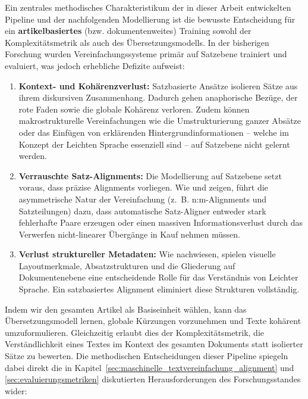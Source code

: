 Ein zentrales methodisches Charakteristikum der in dieser Arbeit entwickelten Pipeline und der nachfolgenden Modellierung ist die bewusste Entscheidung für ein \textbf{artikelbasiertes} (bzw. dokumentenweites) Training sowohl der Komplexitätsmetrik als auch des Übersetzungsmodells. In der bisherigen Forschung wurden Vereinfachungssysteme primär auf Satzebene trainiert und evaluiert, was jedoch erhebliche Defizite aufweist:
\begin{enumerate}
    \item \textbf{Kontext- und Kohärenzverlust:} Satzbasierte Ansätze isolieren Sätze aus ihrem diskursiven Zusammenhang. Dadurch gehen anaphorische Bezüge, der rote Faden sowie die globale Kohärenz verloren. Zudem können makrostrukturelle Vereinfachungen wie die Umstrukturierung ganzer Absätze oder das Einfügen von erklärenden Hintergrundinformationen – welche im Konzept der Leichten Sprache essenziell sind – auf Satzebene nicht gelernt werden.
    \item \textbf{Verrauschte Satz-Alignments:} Die Modellierung auf Satzebene setzt voraus, dass präzise Alignments vorliegen. Wie \citet{stodden2023deplain} und \citet{stajner2018cats} zeigen, führt die asymmetrische Natur der Vereinfachung (z.~B. n:m-Alignments und Satzteilungen) dazu, dass automatische Satz-Aligner entweder stark fehlerhafte Paare erzeugen oder einen massiven Informationsverlust durch das Verwerfen nicht-linearer Übergänge in Kauf nehmen müssen.
    \item \textbf{Verlust struktureller Metadaten:} Wie \citet{battisti2020corpus} nachwiesen, spielen visuelle Layoutmerkmale, Absatzstrukturen und die Gliederung auf Dokumentenebene eine entscheidende Rolle für das Verständnis von Leichter Sprache. Ein satzbasiertes Alignment eliminiert diese Strukturen vollständig.
\end{enumerate}
Indem wir den gesamten Artikel als Basiseinheit wählen, kann das Übersetzungsmodell lernen, globale Kürzungen vorzunehmen und Texte kohärent umzuformulieren. Gleichzeitig erlaubt dies der Komplexitätsmetrik, die Verständlichkeit eines Textes im Kontext des gesamten Dokuments statt isolierter Sätze zu bewerten. Die methodischen Entscheidungen dieser Pipeline spiegeln dabei direkt die in Kapitel~\ref{sec:maschinelle_textvereinfachung_alignment} und \ref{sec:evaluierungsmetriken} diskutierten Herausforderungen des Forschungsstandes wider:
